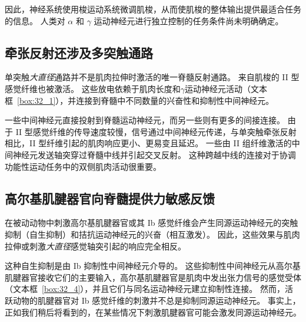 因此，神经系统使用梭运动系统微调肌梭，从而使肌梭的整体输出提供最适合任务的信息。
人类对 $ \alpha $ 和 $ \gamma $ 运动神经元进行独立控制的任务条件尚未明确确定。



\subsection{牵张反射还涉及多突触通路}

单突触\textit{大直径}通路并不是肌肉拉伸时激活的唯一脊髓反射通路。
来自肌梭的 II 型感觉纤维也被激活。
这些放电依赖于肌肉长度和$ \gamma $运动神经元活动（文本框~\ref{box:32_1}），并连接到脊髓中不同数量的兴奋性和抑制性中间神经元。


一些中间神经元直接投射到脊髓运动神经元，而另一些则有更多的间接连接。
由于 II 型感觉纤维的传导速度较慢，信号通过中间神经元传递，与单突触牵张反射相比，II 型纤维引起的肌肉响应更小、更易变且延迟。
一些由 II 组纤维激活的中间神经元发送轴突穿过脊髓中线并引起交叉反射。
这种跨越中线的连接对于协调功能性运动任务中的双侧肌肉活动很重要。



\subsection{高尔基肌腱器官向脊髓提供力敏感反馈}

在被动动物中刺激高尔基肌腱器官或其 Ib 感觉纤维会产生同源运动神经元的突触抑制（自生抑制）和拮抗运动神经元的兴奋（相互激发）。
因此，这些效果与肌肉拉伸或刺激\textit{大直径}感觉轴突引起的响应完全相反。


这种自生抑制是由 Ib 抑制性中间神经元介导的。
这些抑制性中间神经元从高尔基肌腱器官接收它们的主要输入，高尔基肌腱器官是肌肉中发出张力信号的感觉受体（文本框~\ref{box:32_4}），并且它们与同名运动神经元建立抑制性连接。
然而，活跃动物的肌腱器官对 Ib 感觉纤维的刺激并不总是抑制同源运动神经元。
事实上，正如我们稍后将看到的，在某些情况下刺激肌腱器官可能会激发同源运动神经元。


